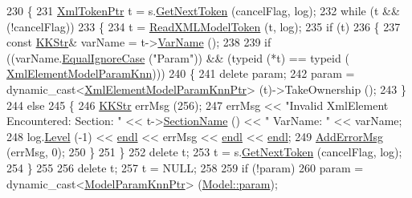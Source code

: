 \begin{DoxyCode}
230 \{
231   \hyperlink{class_k_k_b_1_1_xml_token}{XmlTokenPtr}  t = s.\hyperlink{class_k_k_b_1_1_xml_stream_a87cc738b05c666cf5d5c25beaab477b4}{GetNextToken} (cancelFlag, log);
232   \textcolor{keywordflow}{while}  (t  &&  (!cancelFlag))
233   \{
234     t = \hyperlink{class_k_k_m_l_l_1_1_model_a9feaeb8870d1f137b74586bb434b09d2}{ReadXMLModelToken} (t, log);
235     \textcolor{keywordflow}{if}  (t)
236     \{
237       \textcolor{keyword}{const} \hyperlink{class_k_k_b_1_1_k_k_str}{KKStr}&  varName = t->\hyperlink{class_k_k_b_1_1_xml_token_a28b39cfdfa2ed63048a812b1cb52263c}{VarName} ();
238 
239       \textcolor{keywordflow}{if}  ((varName.\hyperlink{class_k_k_b_1_1_k_k_str_a562f9696417c53f66bc4088eac072ab5}{EqualIgnoreCase} (\textcolor{stringliteral}{"Param"}))  &&  (\textcolor{keyword}{typeid} (*t) == \textcolor{keyword}{typeid} (
      \hyperlink{namespace_k_k_m_l_l_af998b0f3ec84644bcd076fc2a31a8ec2}{XmlElementModelParamKnn})))
240       \{
241         \textcolor{keyword}{delete}  param;
242         param = \textcolor{keyword}{dynamic\_cast<}\hyperlink{class_k_k_m_l_l_1_1_xml_element_model_param_template}{XmlElementModelParamKnnPtr}\textcolor{keyword}{>} (t)->TakeOwnership ();
243       \}
244       \textcolor{keywordflow}{else}
245       \{
246         \hyperlink{class_k_k_b_1_1_k_k_str}{KKStr}  errMsg (256);
247         errMsg << \textcolor{stringliteral}{"Invalid XmlElement Encountered:  Section: "} << t->\hyperlink{class_k_k_b_1_1_xml_token_a20aa05209eeafb58c1c595c15f07d504}{SectionName} () << \textcolor{stringliteral}{" 
       VarName: "} << varName;
248         log.\hyperlink{class_k_k_b_1_1_run_log_a32cf761d7f2e747465fd80533fdbb659}{Level} (-1) << \hyperlink{namespace_k_k_b_ad1f50f65af6adc8fa9e6f62d007818a8}{endl} << errMsg << \hyperlink{namespace_k_k_b_ad1f50f65af6adc8fa9e6f62d007818a8}{endl} << \hyperlink{namespace_k_k_b_ad1f50f65af6adc8fa9e6f62d007818a8}{endl};
249         \hyperlink{class_k_k_m_l_l_1_1_model_adb50e734c8b33aff714bc2071b4800bb}{AddErrorMsg} (errMsg, 0);
250       \}
251     \}
252     \textcolor{keyword}{delete}  t;
253     t = s.\hyperlink{class_k_k_b_1_1_xml_stream_a87cc738b05c666cf5d5c25beaab477b4}{GetNextToken} (cancelFlag, log);
254   \}
255 
256   \textcolor{keyword}{delete}  t;
257   t = NULL;
258 
259   \textcolor{keywordflow}{if}  (!param)
260     param = \textcolor{keyword}{dynamic\_cast<}\hyperlink{class_k_k_m_l_l_1_1_model_param_knn}{ModelParamKnnPtr}\textcolor{keyword}{>} (\hyperlink{class_k_k_m_l_l_1_1_model_a46bd4d1b3ab8d3d9847c1b00b7c0b66f}{Model::param});

\end{DoxyCode}
